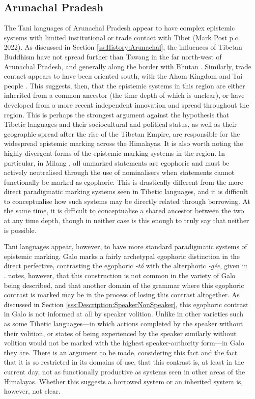 \subsection{Arunachal Pradesh}
The Tani languages of Arunachal Pradesh appear to have complex epistemic systems with limited institutional or trade contact with Tibet (Mark Post p.c. 2022). As discussed in Section \ref{ss:History:Arunachal}, the influences of Tibetan Buddhism have not spread further than Tawang in the far north-west of Arunachal Pradesh, and generally along the border with Bhutan \cite{Namgyal2020}. Similarly, trade contact appears to have been oriented south, with the Ahom Kingdom and Tai people \cite{Nyori1993}. This suggests, then, that the epistemic systems in this region are either inherited from a common ancestor (the time depth of which is unclear), or have developed from a more recent independent innovation and spread throughout the region. This is perhaps the strongest argument against the hypothesis that Tibetic languages and their sociocultural and political status, as well as their geographic spread after the rise of the Tibetan Empire, are responsible for the widespread epistemic marking across the Himalayas. It is also worth noting the highly divergent forms of the epistemic-marking systems in the region. In particular, in Milang \cite[Siangic,][]{Modi2017}, all unmarked statements are egophoric and must be actively neutralised through the use of nominalisers when statements cannot functionally be marked as egophoric. This is drastically different from the more direct paradigmatic marking systems seen in Tibetic languages, and it is difficult to conceptualise how such systems may be directly related through borrowing. At the same time, it is difficult to conceptualise a shared ancestor between the two at any time depth, though in neither case is this enough to truly say that neither is possible.

Tani languages appear, however, to have more standard paradigmatic systems of epistemic marking. Galo marks a fairly archetypal egophoric distinction in the direct perfective, contrasting the egophoric \textit{-tó} with the alterphoric \textit{-gée}, given in .  notes, however, that this construction is not common in the variety of Galo being described, and that another domain of the grammar where this egophoric contrast is marked may be in the process of losing this contrast altogether. As discussed in Section \ref{sss:Description:SpeakerNonSpeaker}, this egophoric contrast in Galo is not informed at all by speaker volition. Unlike in other varieties such as some Tibetic languages---in which actions completed by the speaker without their volition, or states of being experienced by the speaker similarly without volition would not be marked with the highest speaker-authority form---in Galo they are. There is an argument to be made, considering this fact and the fact that it is so restricted in its domains of use, that this contrast is, at least in the current day, not as functionally productive as systems seen in other areas of the Himalayas. Whether this suggests a borrowed system or an inherited system is, however, not clear.

